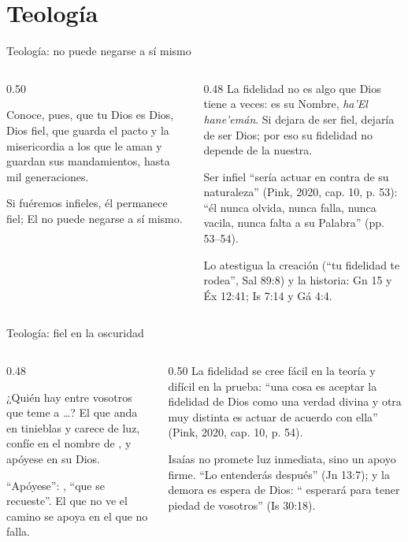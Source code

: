 \section{Teología}

\begin{frame}{Teología: no puede negarse a sí mismo}
\begin{columns}[t,onlytextwidth]
\begin{column}{0.50\textwidth}
\begin{cita}Conoce, pues, que \SENOR{} tu Dios es Dios, Dios fiel, que guarda el pacto y la misericordia a los que le aman y guardan sus mandamientos, hasta mil generaciones.\end{cita}
\begin{cita}Si fuéremos infieles, él permanece fiel; El no puede negarse a sí mismo.\end{cita}
\end{column}
\begin{column}{0.48\textwidth}\small
La fidelidad no es algo que Dios tiene a veces: es su Nombre, \emph{ha'El hane'emán}. Si dejara de ser fiel, dejaría de ser Dios; por eso su fidelidad no depende de la nuestra.\par\medskip
Ser infiel ``sería actuar en contra de su naturaleza'' (Pink, 2020, cap. 10, p. 53): ``él nunca olvida, nunca falla, nunca vacila, nunca falta a su Palabra'' (pp. 53--54).\par\medskip
Lo atestigua la creación (``tu fidelidad te rodea'', Sal 89:8) y la historia: Gn 15 y Éx 12:41; Is 7:14 y Gá 4:4.
\end{column}
\end{columns}
\end{frame}

\begin{frame}{Teología: fiel en la oscuridad}
\begin{columns}[t,onlytextwidth]
\begin{column}{0.48\textwidth}
\begin{cita}¿Quién hay entre vosotros que teme a \SENOR\ldots? El que anda en tinieblas y carece de luz, confíe en el nombre de \SENOR, y apóyese en su Dios.\end{cita}
\scriptsize ``Apóyese'': , ``que se recueste''. El que no ve el camino se apoya en el que no falla.
\end{column}
\begin{column}{0.50\textwidth}\small
La fidelidad se cree fácil en la teoría y difícil en la prueba: ``una cosa es aceptar la fidelidad de Dios como una verdad divina y otra muy distinta es actuar de acuerdo con ella'' (Pink, 2020, cap. 10, p. 54).\par\medskip
Isaías no promete luz inmediata, sino un apoyo firme. ``Lo entenderás después'' (Jn 13:7); y la demora es espera de Dios: ``\SENOR{} esperará para tener piedad de vosotros'' (Is 30:18).
\end{column}
\end{columns}
\end{frame}

